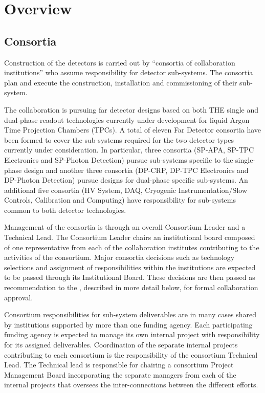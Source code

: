 \chapter{Overview}
\label{vl:tc-overview}

\section{Consortia}
\label{sec:consortia}

Construction of the  detectors is carried out by
``consortia of collaboration institutions'' who assume responsibility
for detector sub-systems.  The consortia plan and
execute the construction, installation and commissioning of their
sub-system.

The  collaboration is pursuing far detector designs based on both
THE single and dual-phase readout technologies currently under
development for liquid Argon Time Projection Chambers (TPCs).  A total
of eleven Far Detector consortia have been formed to cover the
sub-systems required for the two detector types currently under
consideration.  In particular, three consortia (SP-APA, SP-TPC
Electronics and SP-Photon Detection) pursue sub-systems specific to
the single-phase design and another three consortia (DP-CRP, DP-TPC
Electronics and DP-Photon Detection) pursue designs for dual-phase
specific sub-systems.  An additional five consortia (HV System, DAQ,
Cryogenic Instrumentation/Slow Controls, Calibration and Computing)
have responsibility for sub-systems common to both detector
technologies.

Management of the consortia is through an overall Consortium Leader
and a Technical Lead.  The Consortium Leader chairs an institutional
board composed of one representative from each of the collaboration
institutes contributing to the activities of the consortium.  Major
consortia decisions such as technology selections and assignment of
responsibilities within the institutions are expected to be passed
through its Institutional Board.  These decisions are then passed as
recommendation to the  , described in more detail
below, for formal collaboration approval.

Consortium responsibilities for sub-system deliverables are in many
cases shared by institutions supported by more than one funding
agency.  Each participating funding agency is expected to manage its
own internal project with responsibility for its assigned
deliverables.  Coordination of the separate internal projects
contributing to each consortium is the responsibility of the
consortium Technical Lead.  The Technical lead is responsible for
chairing a consortium Project Management Board incorporating the
separate managers from each of the internal projects that oversees the
inter-connections between the different efforts.

